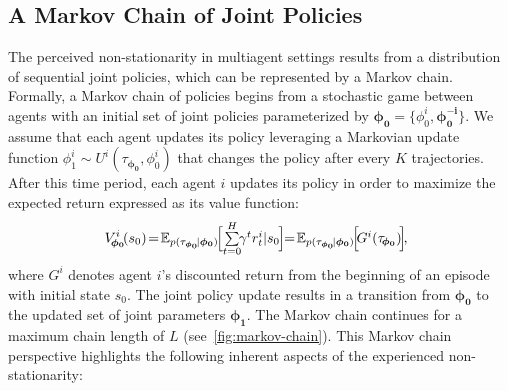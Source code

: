 \subsection{A Markov Chain of Joint Policies}\label{sec:markov-chain-of-policies}
The perceived non-stationarity in multiagent settings results from a distribution of sequential joint policies, which can be represented by a Markov chain.
Formally, a Markov chain of policies begins from a stochastic game between agents with an initial set of joint policies parameterized by $\bm{\phi}_{\bm{0}}\!=\!\{\phi^{i}_{0},\bm{\phi}^{\bm{-i}}_{\bm{0}}\}$. 
We assume that each agent updates its policy leveraging a Markovian update function $\phi^{i}_{1}\!\sim\!U^{i}(\tau_{\bm{\phi}_{\bm{0}}},\phi^{i}_{0})$ that changes the policy after every $K$ trajectories. 
After this time period, each agent $i$ updates its policy in order to maximize the expected return expressed as its value function:%
\begin{gather}
\!\!\!V^{i}_{\!\bm{\phi}_{\bm{0}}}\!(s_{0})\!=\!\mathbb{E}_{p(\tau_{\bm{\phi}_{\bm{0}}}\!|\bm{\phi}_{\bm{0}})}\!\Big[\!\smallsum_{t=0}^{H}\!\!\gamma^{t}r^{i}_{t}|s_{0}\hspace{-0.1em}\Big]\!\!=\!\mathbb{E}_{p(\tau_{\bm{\phi}_{\bm{0}}}\!|\bm{\phi}_{\bm{0}})}\!\Big[\!G^{i}(\tau_{\!\bm{\phi}_{\bm{0}}})\!\Big]\!,\label{eqn:value-function}
\end{gather}
where $G^{i}$ denotes agent $i$'s discounted return from the beginning of an episode with initial state $s_0$.
The joint policy update results in a transition from $\bm{\phi}_{\bm{0}}$ to the updated set of joint parameters $\bm{\phi}_{\bm{1}}$.
The Markov chain continues for a maximum chain length of $L$ (see~\cref{fig:markov-chain}). 
This Markov chain perspective highlights the following inherent aspects of the experienced non-stationarity:

